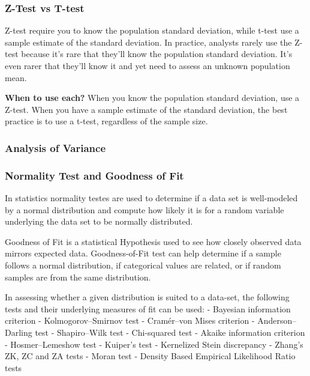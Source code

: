 \documentclass[11pt]{article}
\begin{document}
\hypertarget{z-test-vs-t-test}{%
\subsubsection{Z-Test vs T-test}\label{z-test-vs-t-test}}

Z-test require you to know the population standard deviation, while
t-test use a sample estimate of the standard deviation. In practice,
analysts rarely use the Z-test because it's rare that they'll know the
population standard deviation. It's even rarer that they'll know it and
yet need to assess an unknown population mean.

\textbf{When to use each?} When you know the population standard
deviation, use a Z-test. When you have a sample estimate of the standard
deviation, the best practice is to use a t-test, regardless of the
sample size.

\hypertarget{analysis-of-variance}{%
\subsubsection{Analysis of Variance}\label{analysis-of-variance}}

\hypertarget{normality-test-and-goodness-of-fit}{%
\subsubsection{Normality Test and Goodness of
Fit}\label{normality-test-and-goodness-of-fit}}

In statistics normality testes are used to determine if a data set is
well-modeled by a normal distribution and compute how likely it is for a
random variable underlying the data set to be normally distributed.

Goodness of Fit is a statistical Hypothesis used to see how closely
observed data mirrors expected data. Goodness-of-Fit test can help
determine if a sample follows a normal distribution, if categorical
values are related, or if random samples are from the same distribution.

In assessing whether a given distribution is suited to a data-set, the
following tests and their underlying measures of fit can be used: -
Bayesian information criterion - Kolmogorov--Smirnov test - Cramér--von
Mises criterion - Anderson--Darling test - Shapiro--Wilk test -
Chi-squared test - Akaike information criterion - Hosmer--Lemeshow test
- Kuiper's test - Kernelized Stein discrepancy - Zhang's ZK, ZC and ZA
tests - Moran test - Density Based Empirical Likelihood Ratio tests
\end{document}
